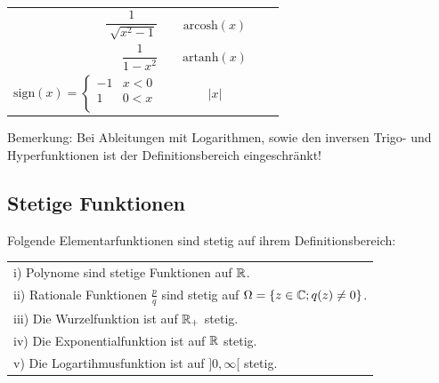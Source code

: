\begin{multicols*}{3}
\begin{center}
\begin{tabular} {r c c c l}
            $\dfrac{1}{\sqrt[]{x^2 - 1}}$         & \hspace*{-20pt} & $\text{arcosh}(x)$ & \hspace*{-20pt} &                              \\
            $\dfrac{1}{1 - x^2}$                  & \hspace*{-20pt} & $\text{artanh}(x)$ & \hspace*{-20pt} &                              \\
            \midrule
            $\text{sign}(x) = \begin{cases}
                                      -1 & x < 0 \\  1 & 0 < x \\
                                  \end{cases}$ \hspace*{-10pt}       & \hspace*{-20pt} & $|x|$              & \hspace*{-20pt} &               \\
            \bottomrule
        \end{tabular}
    \end{center}

    Bemerkung: Bei Ableitungen mit Logarithmen, sowie den inversen Trigo- und Hyperfunktionen ist der Definitionsbereich eingeschränkt!


    \subsection{Stetige Funktionen}

    Folgende Elementarfunktionen sind stetig auf ihrem Definitionsbereich:

    \begin{center}
        \begin{tabular}{l} \toprule
            i) Polynome sind stetige Funktionen auf $\mathbb{R}$.                                                 \\
            ii) Rationale Funktionen $\frac{p}{q}$ sind stetig auf $\Omega = \{ z \in \mathbb{C}; q(z) \neq 0\}$. \\
            iii) Die Wurzelfunktion ist auf $\mathbb{R}_+$ stetig.                                                \\
            iv) Die Exponentialfunktion ist auf $\mathbb{R}$ stetig.                                              \\
            v) Die Logartihmusfunktion ist auf $]0, \infty[$ stetig.                                      \\
            \bottomrule
        \end{tabular}
    \end{center}
    \vfill\null
    \columnbreak



\end{multicols*}
